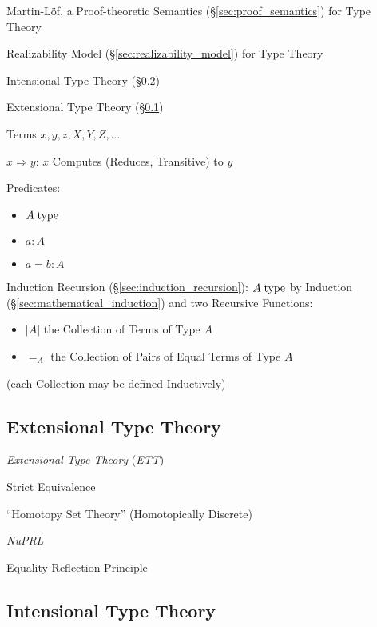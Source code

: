 Martin-L\"of, a Proof-theoretic Semantics
(\S\ref{sec:proof_semantics}) for Type Theory

Realizability Model (\S\ref{sec:realizability_model}) for Type Theory

Intensional Type Theory (\S\ref{sec:intensional_type})

Extensional Type Theory (\S\ref{sec:extensional_type})

Terms $x,y,z,X,Y,Z,\ldots$

$x \Rightarrow y$: $x$ Computes (Reduces, Transitive) to $y$

Predicates:
\begin{itemize}
  \item $A \;\mathrm{type}$
  \item $a : A$
  \item $a = b : A$
\end{itemize}

Induction Recursion (\S\ref{sec:induction_recursion}): $A \;\mathrm{type}$ by
Induction (\S\ref{sec:mathematical_induction}) and two Recursive
Functions:
\begin{itemize}
  \item $|A|$ the Collection of Terms of Type $A$
  \item $=_A$ the Collection of Pairs of Equal Terms of Type $A$
\end{itemize}
(each Collection may be defined Inductively)



\subsection{Extensional Type Theory}\label{sec:extensional_type}
\cite{harper12}

\emph{Extensional Type Theory} (\emph{ETT})

Strict Equivalence

``Homotopy Set Theory'' (Homotopically Discrete)

\emph{NuPRL}

Equality Reflection Principle



\subsection{Intensional Type Theory}\label{sec:intensional_type}
\cite{harper12}

